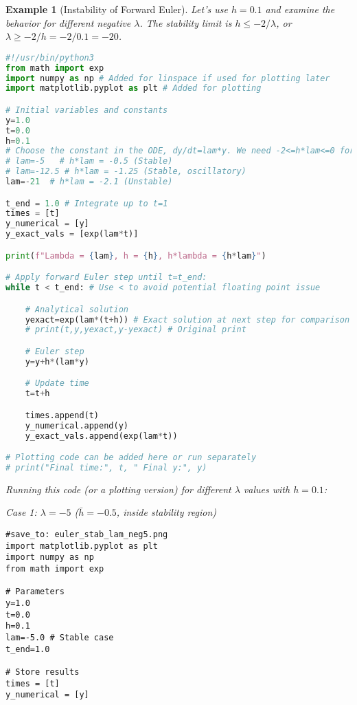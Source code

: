 \documentclass{article}
\newtheorem{example}{Example}
\begin{document}
\begin{example}[Instability of Forward Euler]
Let's use $h=0.1$ and examine the behavior for different negative $\lambda$. The stability limit is $h \le -2/\lambda$, or $\lambda \ge -2/h = -2/0.1 = -20$.

\begin{lstlisting}[language=Python, breaklines=true, caption={Python code (\texttt{e\_stab.py}) to demonstrate stability/instability of Forward Euler.}, label=lst:e_stab_py]
#!/usr/bin/python3
from math import exp
import numpy as np # Added for linspace if used for plotting later
import matplotlib.pyplot as plt # Added for plotting

# Initial variables and constants
y=1.0
t=0.0
h=0.1
# Choose the constant in the ODE, dy/dt=lam*y. We need -2<=h*lam<=0 for stability.
# lam=-5   # h*lam = -0.5 (Stable)
# lam=-12.5 # h*lam = -1.25 (Stable, oscillatory)
lam=-21  # h*lam = -2.1 (Unstable)

t_end = 1.0 # Integrate up to t=1
times = [t]
y_numerical = [y]
y_exact_vals = [exp(lam*t)]

print(f"Lambda = {lam}, h = {h}, h*lambda = {h*lam}")

# Apply forward Euler step until t=t_end:
while t < t_end: # Use < to avoid potential floating point issue

    # Analytical solution
    yexact=exp(lam*(t+h)) # Exact solution at next step for comparison
    # print(t,y,yexact,y-yexact) # Original print

    # Euler step
    y=y+h*(lam*y)

    # Update time
    t=t+h

    times.append(t)
    y_numerical.append(y)
    y_exact_vals.append(exp(lam*t))

# Plotting code can be added here or run separately
# print("Final time:", t, " Final y:", y)
\end{lstlisting}

Running this code (or a plotting version) for different $\lambda$ values with $h=0.1$:

\textit{Case 1: $\lambda = -5$ ($\bar{h} = -0.5$, inside stability region)}
\begin{verbatim}
#save_to: euler_stab_lam_neg5.png
import matplotlib.pyplot as plt
import numpy as np
from math import exp

# Parameters
y=1.0
t=0.0
h=0.1
lam=-5.0 # Stable case
t_end=1.0

# Store results
times = [t]
y_numerical = [y]


\end{verbatim}
\end{example}
\end{document}
